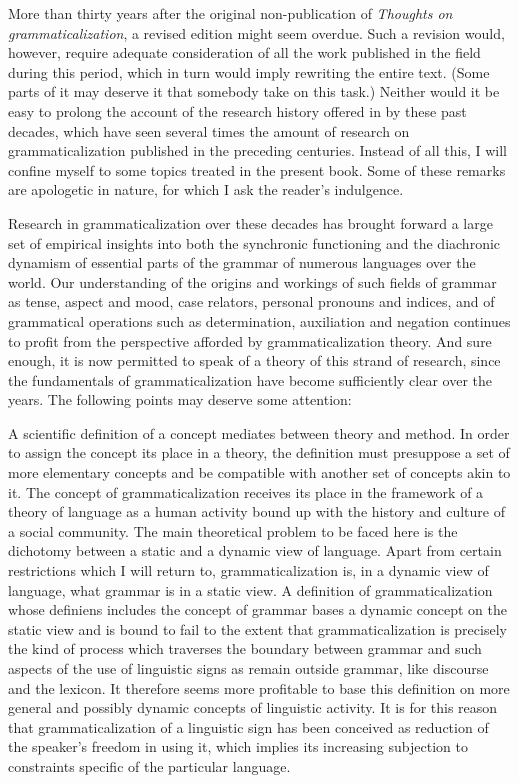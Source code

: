 
More than thirty years after the original non-publication of \textit{Thoughts on grammaticalization}, a revised edition might seem overdue. Such a revision would, however, require adequate consideration of all the work published in the field during this period, which in turn would imply rewriting the entire text. (Some parts of it may deserve it that somebody take on this task.) Neither would it be easy to prolong the account of the research history offered in  by these past decades, which have seen several times the amount of research on grammaticalization published in the preceding centuries. Instead of all this, I will confine myself to some topics treated in the present book. Some of these remarks are apologetic in nature, for which I ask the reader’s indulgence.

Research in grammaticalization over these decades has brought forward a large set of empirical insights into both the synchronic functioning and the diachronic dynamism of essential parts of the grammar of numerous languages over the world. Our understanding of the origins and workings of such fields of grammar as tense, aspect and mood, case relators, personal pronouns and indices, and of grammatical operations such as determination, auxiliation and negation continues to profit from the perspective afforded by grammaticalization theory. And sure enough, it is now permitted to speak of a theory of this strand of research, since the fundamentals of grammaticalization have become sufficiently clear over the years. The following points may deserve some attention:

A scientific definition of a concept mediates between theory and method. In order to assign the concept its place in a theory, the definition must presuppose a set of more elementary concepts and be compatible with another set of concepts akin to it. The concept of grammaticalization receives its place in the framework of a theory of language as a human activity bound up with the history and culture of a social community.  The main theoretical problem to be faced here is the dichotomy between a static and a dynamic view of language. Apart from certain restrictions which I will return to, grammaticalization is, in a dynamic view of language, what grammar is in a static view. A definition of grammaticalization whose definiens includes the concept of grammar bases a dynamic concept on the static view and is bound to fail to the extent that grammaticalization is precisely the kind of process which traverses the boundary between grammar and such aspects of the use of linguistic signs as remain outside grammar, like discourse and the lexicon. It therefore seems more profitable to base this definition on more general and possibly dynamic concepts of linguistic activity. It is for this reason that grammaticalization of a linguistic sign has been conceived as reduction of the speaker’s freedom in using it, which implies its increasing subjection to constraints specific of the particular language.

